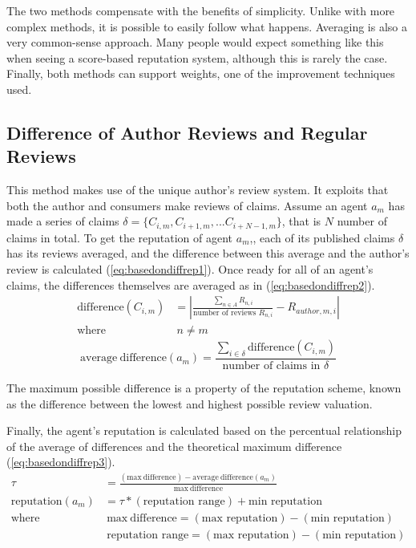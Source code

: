 \documentclass[%
    ]{\PathToTumTemplate/thesis/tum_thesis}
\begin{document}
The two methods compensate with the benefits of simplicity.
Unlike with more complex methods, it is possible to easily follow what happens.
Averaging is also a very common-sense approach.
Many people would expect something like this when seeing a score-based reputation system, although this is rarely the case.
Finally, both methods can support weights, one of the improvement techniques used.

\subsection{Difference of Author Reviews and Regular Reviews}\label{sec:approac_repcalc_basedondifference}
This method makes use of the unique author's review system.
It exploits that both the author and consumers make reviews of claims.
Assume an agent $a_m$ has made a series of claims $\delta=\{C_{i,m}, C_{i+1,m},...C_{i+N-1,m}\}$, that is $N$ number of claims in total.
To get the reputation of agent $a_m$,, each of its published claims $\delta$ has its reviews averaged, and the difference between this average and the author's review is calculated (\ref{eq:basedondiffrep1}). Once ready for all of an agent's claims, the differences themselves are averaged as in (\ref{eq:basedondiffrep2}).
\begin{equation} \label{eq:basedondiffrep1}
\begin{aligned}
\mathrm{difference}(C_{i,m})&=\left|\frac{\sum_{n \in A} R_{n,i}}{\text{number of reviews }R_{n,i}}-R_{author,m,i}\right| \\
\text{where}&~ n\neq m
\end{aligned}
\end{equation}
\begin{equation} \label{eq:basedondiffrep2}
\mathrm{average~difference}(a_m)=\frac{\sum_{i\in\delta}\mathrm{difference}(C_{i,m})}{\text{number of claims in }\delta}
\end{equation}

The maximum possible difference is a property of the reputation scheme, known as the difference between the lowest and highest possible review valuation.

Finally, the agent's reputation is calculated based on the percentual relationship of the average of differences and the theoretical maximum difference (\ref{eq:basedondiffrep3}).
\begin{equation} \label{eq:basedondiffrep3}
\begin{aligned}
\tau &=\frac{(\mathrm{max~difference})-\mathrm{average~difference}(a_m)}{\mathrm{max~difference}} \\
\mathrm{reputation}(a_m)&=\tau*(\text{reputation range})+\text{min reputation} \\
\text{where}&~ \mathrm{max~difference}=(\text{max reputation})-(\text{min reputation}) \\
&~ \text{reputation range}=(\text{max reputation})-(\text{min reputation})
\end{aligned}
\end{equation}
\end{document}
